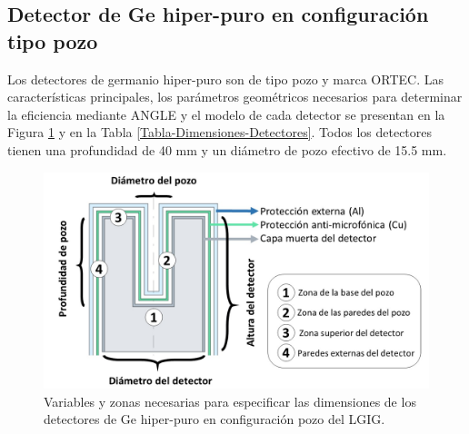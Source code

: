		\subsection[Detectores de Ge hiper-puro]{Detector de Ge hiper-puro en configuración tipo pozo}\label{SubSecc-DetecGe}
Los detectores de germanio hiper-puro son de tipo pozo y marca ORTEC. Las características principales, los parámetros geométricos necesarios para determinar la eficiencia mediante ANGLE y el modelo de cada detector se presentan en la Figura \ref{Fig-DetectorGeEsquema} y en la Tabla \ref{Tabla-Dimensiones-Detectores}. Todos los detectores tienen una profundidad de 40 mm y un diámetro de pozo efectivo de 15.5 mm.
\begin{figure}[h]
\centering
\includegraphics[width=\textwidth]{Imagenes/Zona_Detector_Ge.jpg}
\caption{Variables y zonas necesarias para especificar las dimensiones de los detectores de Ge hiper-puro en configuración pozo del LGIG.}\label{Fig-DetectorGeEsquema}
\end{figure}
